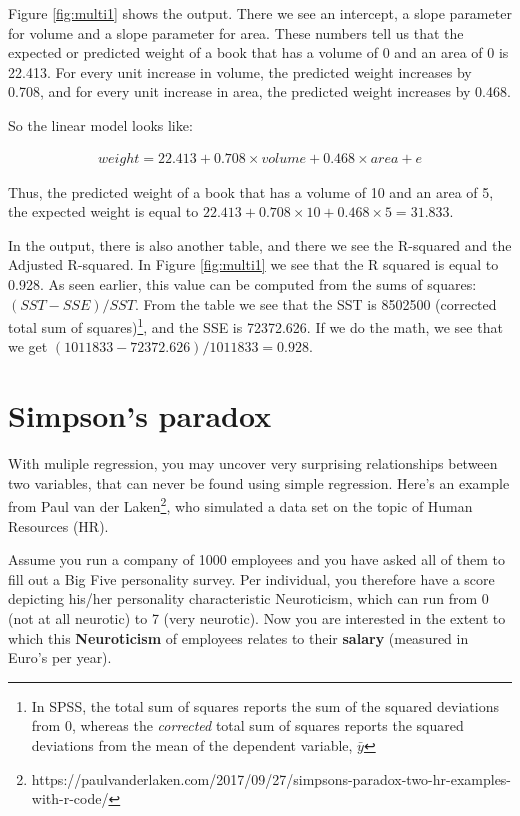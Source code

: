 \documentclass[]{report}\usepackage[]{graphicx}\usepackage[]{color}
\begin{document}
Figure \ref{fig:multi1} shows the output. There we see an intercept, a slope parameter for volume and a slope parameter for area. These numbers tell us that the expected or predicted weight of a book that has a volume of 0 and an area of 0 is 22.413. For every unit increase in volume, the predicted weight increases by 0.708, and for every unit increase in area, the predicted weight increases by 0.468.

So the linear model looks like:


\begin{eqnarray}
weight =  22.413 + 0.708 \times volume + 0.468 \times area + e
\end{eqnarray}

Thus, the predicted weight of a book that has a volume of 10 and an area of 5, the expected weight is equal to $22.413 + 0.708 \times 10 + 0.468 \times 5 = 31.833$.

In the output, there is also another table, and there we see the R-squared and the Adjusted R-squared. In Figure \ref{fig:multi1} we see that the R squared is equal to 0.928. As seen earlier, this value can be computed from the sums of squares: $(SST-SSE)/SST$. From the table we see that the SST is 8502500 (corrected total sum of squares)\footnote{In SPSS, the total sum of squares reports the sum of the squared deviations from 0, whereas the \textit{corrected} total sum of squares reports the squared deviations from the mean of the dependent variable, $\bar{y}$}, and the SSE is 72372.626. If we do the math, we see that we get $(1011833-72372.626)/1011833= 0.928$.



\section{Simpson's paradox}

With muliple regression, you may uncover very surprising relationships between two variables, that can never be found using simple regression. Here's an example from Paul van der Laken\footnote{https://paulvanderlaken.com/2017/09/27/simpsons-paradox-two-hr-examples-with-r-code/}, who simulated a data set on the topic of Human Resources (HR).

Assume you run a company of 1000 employees and you have asked all of them to fill out a Big Five personality survey. Per individual, you therefore have a score depicting his/her personality characteristic Neuroticism, which can run from 0 (not at all neurotic) to 7 (very neurotic). Now you are interested in the extent to which this \textbf{Neuroticism} of employees relates to their \textbf{salary} (measured in Euro’s per year).
\end{document}
